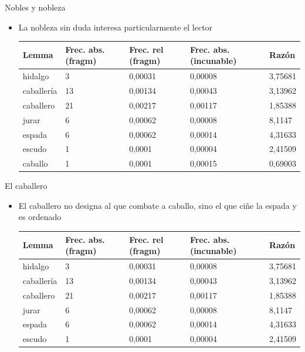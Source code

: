 \documentclass[11pt,aspectratio=169]{beamer}
\begin{document}
\begin{frame}{Nobles y nobleza}
\begin{center}
\begin{itemize}
\item La nobleza sin duda interesa particularmente el lector
\begin{table}[!ht]
    \centering
    \begin{tabular}{|l|l|l|l|l|}
    \hline
        \textbf{Lemma} & \textbf{Frec. abs. (fragm)} & \textbf{Frec. rel (fragm)} & \textbf{Frec. abs. (incunable)} & \textbf{Razón} \\ \hline
        hidalgo & 3 & 0,00031 & 0,00008 & 3,75681 \\ \hline
        caballería & 13 & 0,00134 & 0,00043 & 3,13962 \\ \hline
        caballero & 21 & 0,00217 & 0,00117 & 1,85388 \\ \hline
        jurar & 6 & 0,00062 & 0,00008 & 8,1147 \\ \hline
        espada & 6 & 0,00062 & 0,00014 & 4,31633 \\ \hline
        escudo & 1 & 0,0001 & 0,00004 & 2,41509 \\ \hline
        caballo & 1 & 0,0001 & 0,00015 & 0,69003 \\ \hline
    \end{tabular}
\end{table}
\end{itemize}
\end{center}
\end{frame}

\begin{frame}{El caballero}
\begin{center}
\begin{itemize}
\item El caballero no designa al que combate a caballo, sino el que ciñe la espada y es ordenado
\begin{table}[!ht]
    \centering
    \begin{tabular}{|l|l|l|l|l|}
    \hline
        \textbf{Lemma} & \textbf{Frec. abs. (fragm)} & \textbf{Frec. rel (fragm)} & \textbf{Frec. abs. (incunable)} & \textbf{Razón} \\ \hline
        hidalgo & 3 & 0,00031 & 0,00008 & 3,75681 \\ \hline
        caballería & 13 & 0,00134 & 0,00043 & 3,13962 \\ \hline
        caballero & 21 & 0,00217 & 0,00117 & 1,85388 \\ \hline
        jurar & 6 & 0,00062 & 0,00008 & 8,1147 \\ \hline
        espada & 6 & 0,00062 & 0,00014 & 4,31633 \\ \hline
        escudo & 1 & 0,0001 & 0,00004 & 2,41509 \\ \hline
    \end{tabular}
\end{table}
\end{itemize}
\end{center}
\end{frame}
\end{document}
